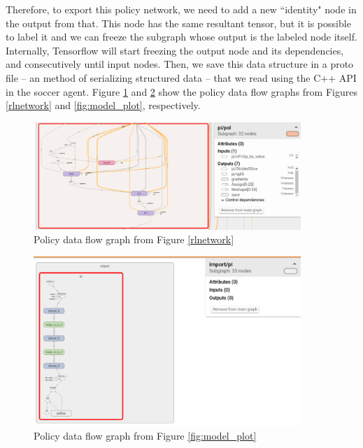 Therefore, to export this policy network, we need to add a new ``identity" node in the output from that. This node has the same resultant tensor, but it is possible to label it and we can freeze the subgraph whose output is the labeled node itself. Internally, Tensorflow will start freezing the output node and its dependencies, and consecutively	 until input nodes. Then, we save this data structure in a proto file -- an method of serializing structured data -- that we read using the C++ API in the soccer agent. Figure \ref{fig:policygraph1} and \ref{fig:policygraph2} show the policy data flow graphs from Figures \ref{rlnetwork} and \ref{fig:model_plot}, respectively.



\begin{figure}[!htbp]
	\centering
	\includegraphics[width=0.9\textwidth]{Cap5/policygraph1.eps}
	\caption{ Policy data flow graph from Figure \ref{rlnetwork}
	}
	\label{fig:policygraph1}
\end{figure}

\begin{figure}[!htbp]
	\centering
	\includegraphics[width=0.9\textwidth]{Cap5/policygraph2.eps}
	\caption{ Policy data flow graph from Figure \ref{fig:model_plot}
	}
	\label{fig:policygraph2}
\end{figure}


